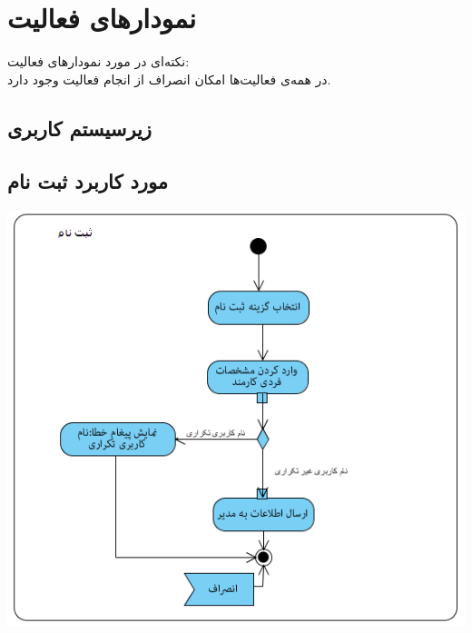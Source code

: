 
\newpage
\section{نمودارهای فعالیت}

نکته‌ای در مورد نمودارهای فعالیت:
\\
در همه‌ی فعالیت‌ها امکان انصراف از انجام فعالیت وجود دارد.

\vspace{1cm}
\subsection{زیرسیستم کاربری}

\vspace{1cm}
\subsection*{مورد کاربرد ثبت نام}
\vspace{2cm}
\begin{center}
\includegraphics[width=\textwidth]{ActivityDiagrams/1.png}
\end{center}

\newpage
\vspace{2cm}
